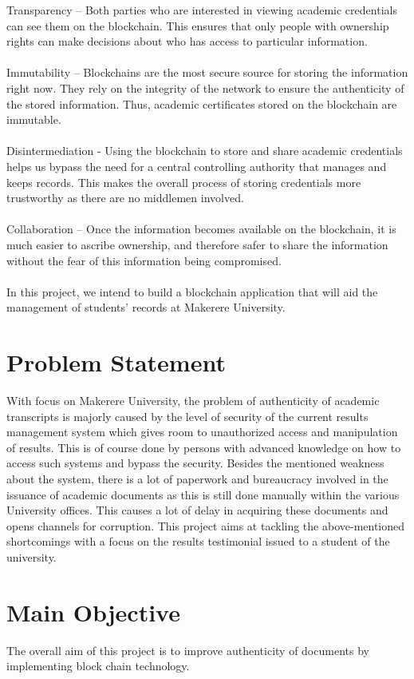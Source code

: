 Transparency – Both parties who are interested in viewing academic credentials can see them on the  blockchain. This ensures that only people with ownership rights can make decisions about who has access to particular information.\\\\
Immutability – Blockchains are the most secure source for storing the information right now. They rely on the integrity of the network to ensure the authenticity of the stored information. Thus, academic certificates stored on the blockchain are immutable.\\\\
Disintermediation - Using the blockchain to store and share academic credentials helps us bypass the need for a central controlling authority that manages and keeps records. This makes the overall process of storing credentials more trustworthy as there are no middlemen involved.\\\\
Collaboration – Once the information becomes available on the blockchain, it is much easier to ascribe ownership, and therefore safer to share the information without the fear of this information being compromised.\\\\
In this project, we intend to build a blockchain application that will aid the management of students' records at Makerere University. 




\section{Problem Statement}
With focus on Makerere University, the problem of authenticity of academic transcripts is majorly caused by the level of security of the current results management system which gives room to unauthorized access and manipulation of results. This is of course done by persons with advanced knowledge on how to access such systems and bypass the security. Besides the mentioned weakness about the system, there is a lot of paperwork and bureaucracy involved in the issuance of academic documents as this is still done manually within the various University offices. This causes a lot of delay in acquiring these documents and opens channels for corruption. This project aims at tackling the above-mentioned shortcomings with a focus on the results testimonial issued to a student of the university.

\section{Main Objective}
The overall aim of this project is to improve authenticity of documents by implementing block chain technology.
